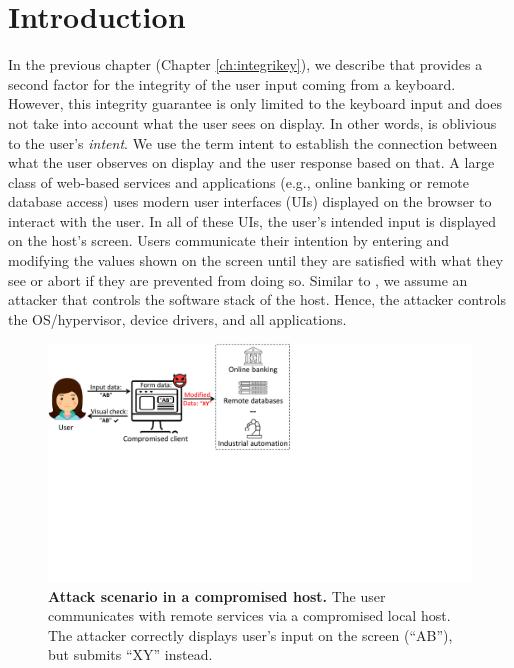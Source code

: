 \section{Introduction}
\label{integriscreen:sec:intro}

In the previous chapter (Chapter \ref{ch:integrikey}), we describe \integrikey that provides a second factor for the integrity of the user input coming from a keyboard. However, this integrity guarantee is only limited to the keyboard input and does not take into account what the user sees on display. In other words, \integrikey is oblivious to the user's \emph{intent}. We use the term intent to establish the connection between what the user observes on display and the user response based on that. A large class of web-based services and applications (e.g., online banking or remote database access) uses modern user interfaces (UIs) displayed on the browser to interact with the user. In all of these UIs, the user's intended input is displayed on the host's screen. Users communicate their intention by entering and modifying the values shown on the screen until they are satisfied with what they see or abort if they are prevented from doing so. Similar to \integrikey, we assume an attacker that controls the software stack of the host. Hence, the attacker controls the OS/hypervisor, device drivers, and all applications. 


\begin{figure}[t]
 \centering
\includegraphics[trim={0 10.4cm 14.4cm 0},clip,width=0.75\linewidth]{chapters/IntegriScreen/img/motivatingScenario.pdf}
\caption[Attack scenario in a compromised host]{\textbf{Attack scenario in a compromised host.}
 	The user communicates with remote services via a compromised local host. The attacker correctly displays user's input on the screen (``AB''), but submits ``XY'' instead.
 	}
 \label{fig:scenario}
\end{figure}



